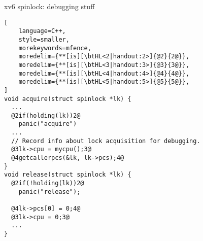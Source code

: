 \begin{frame}[fragile,label=xv6SpinlockDebug]{xv6 spinlock: debugging stuff}
\begin{lstlisting}[
    language=C++,
    style=smaller,
    morekeywords=mfence,
    moredelim={**[is][\btHL<2|handout:2>]{@2}{2@}},
    moredelim={**[is][\btHL<3|handout:3>]{@3}{3@}},
    moredelim={**[is][\btHL<4|handout:4>]{@4}{4@}},
    moredelim={**[is][\btHL<5|handout:5>]{@5}{5@}},
]
void acquire(struct spinlock *lk) {
  ...
  @2if(holding(lk))2@
    panic("acquire")
  ...
  // Record info about lock acquisition for debugging.
  @3lk->cpu = mycpu();3@
  @4getcallerpcs(&lk, lk->pcs);4@
}
void release(struct spinlock *lk) {
  @2if(!holding(lk))2@
    panic("release");

  @4lk->pcs[0] = 0;4@
  @3lk->cpu = 0;3@
  ...
}
\end{lstlisting}
\end{frame}
